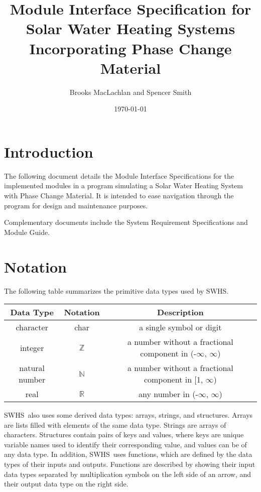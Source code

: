 \documentclass[12pt]{article}
\newcommand{\progname}{SWHS}
\begin{document}
\title{Module Interface Specification for Solar Water Heating Systems
  Incorporating Phase Change Material}

\author{Brooks MacLachlan and Spencer Smith}

\date{\today}

\maketitle

\tableofcontents

\section{Introduction}

The following document details the Module Interface Specifications for the
implemented modules in a program simulating a Solar Water Heating System with
Phase Change Material.  It is intended to ease navigation through the program
for design and maintenance purposes.

Complementary documents include the System Requirement Specifications and Module
Guide.

\section{Notation}

The following table summarizes the primitive data types used by \progname. 

\begin{center}
\renewcommand{\arraystretch}{1.2}
\noindent 
\begin{tabular}{c c c} 
\toprule 
\textbf{Data Type} & \textbf{Notation} & \textbf{Description}\\ 
\midrule
character & char & a single symbol or digit\\
integer & $\mathbb{Z}$ & a number without a fractional component in (-$\infty$, $\infty$) \\
natural number & $\mathbb{N}$ & a number without a fractional component in [1, $\infty$) \\
real & $\mathbb{R}$ & any number in (-$\infty$, $\infty$)\\
\bottomrule
\end{tabular} 
\end{center}

\noindent
\progname \ also uses some derived data types: arrays, strings, and
structures. Arrays are lists filled with elements of the same data type. Strings
are arrays of characters. Structures contain pairs of keys and values, where
keys are unique variable names used to identify their corresponding value, and
values can be of any data type. In addition, \progname \ uses functions, which
are defined by the data types of their inputs and outputs. Functions are
described by showing their input data types separated by multiplication symbols
on the left side of an arrow, and their output data type on the right side.
\end{document}
